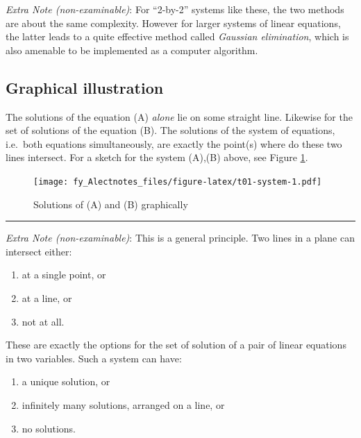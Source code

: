 \documentclass[
  12pt,
  oneside]{book}
\providecommand{\tightlist}{%
  \setlength{\itemsep}{0pt}\setlength{\parskip}{0pt}}
\theoremstyle{definition}
\theoremstyle{definition}
\theoremstyle{definition}
\theoremstyle{definition}
\theoremstyle{remark}
\begin{document}
\emph{Extra Note (non-examinable)}: For ``2-by-2'' systems like these, the two methods are about the same complexity. However for larger systems of linear equations, the latter leads to a quite effective method called \emph{Gaussian elimination}, which is also amenable to be implemented as a computer algorithm.

\subsection{Graphical illustration}\label{graphical-illustration}

The solutions of the equation (A) \emph{alone} lie on some straight line. Likewise for the set of solutions of the equation (B). The solutions of the system of equations, i.e.~both equations simultaneously, are exactly the point(s) where do these two lines intersect. For a sketch for the system (A),(B) above, see Figure \ref{fig:t01-system}.

\begin{figure}
\centering
\texttt{[image: fy\_Alectnotes\_files/figure-latex/t01-system-1.pdf]}
\caption{\label{fig:t01-system}Solutions of (A) and (B) graphically}
\end{figure}

\begin{center}\rule{0.5\linewidth}{0.5pt}\end{center}

\emph{Extra Note (non-examinable)}: This is a general principle. Two lines in a plane can intersect either:

\begin{enumerate}
\def\labelenumi{\alph{enumi})}
\tightlist
\item
  at a single point, or
\item
  at a line, or
\item
  not at all.
\end{enumerate}

These are exactly the options for the set of solution of a pair of linear equations in two variables. Such a system can have:

\begin{enumerate}
\def\labelenumi{\alph{enumi})}
\tightlist
\item
  a unique solution, or
\item
  infinitely many solutions, arranged on a line, or
\item
  no solutions.
\end{enumerate}
\end{document}

